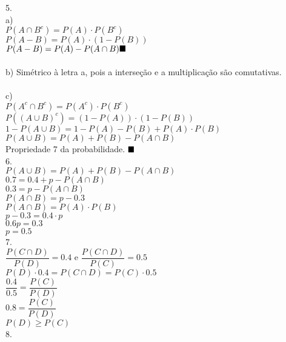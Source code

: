 \documentclass[12pt]{article}
\begin{document}
5.\\
a)\\
$P(A \cap B^{c}) = P(A) \cdot P(B^{c})$\\
$P(A - B) = P(A) \cdot (1 - P(B))$\\
$P(A - B) = P(A) - P(A \cap B) \hfill\blacksquare$\\\\
b) Simétrico à letra a, pois a interseção e a multiplicação são comutativas.\\\\
c) \\
$P(A^{c} \cap B^{c}) = P(A^{c}) \cdot P(B^{c})$\\
$P((A \cup B)^{c}) = (1 - P(A)) \cdot (1 - P(B))$\\
$1 - P(A \cup B) = 1 - P(A) - P(B) + P(A) \cdot P(B)$\\
$P(A \cup B) = P(A) + P(B) - P(A \cap B)$\\
Propriedade 7 da probabilidade. $\hfill\blacksquare$\\

6.\\
$P(A \cup B) = P(A) + P(B) - P(A \cap B)$\\
$0.7 = 0.4 + p - P(A \cap B)$\\
$0.3 =  p - P(A \cap B)$\\
$P(A \cap B) = p - 0.3$\\
$P(A \cap B) = P(A) \cdot P(B)$\\
$p - 0.3 = 0.4 \cdot p$\\
$0.6p = 0.3$\\
$p = 0.5$\\

7.\\
$\dfrac{P(C \cap D)}{P(D)} = 0.4$ e $\dfrac{P(C \cap D)}{P(C)} = 0.5$\\ 
$P(D) \cdot 0.4 = P(C \cap D) = P(C) \cdot 0.5$\\
$\dfrac{0.4}{0.5} = \dfrac{P(C)}{P(D)}$\\
$0.8 =  \dfrac{P(C)}{P(D)}$\\
$P(D) \geq P(C)$\\

8.
\end{document}
